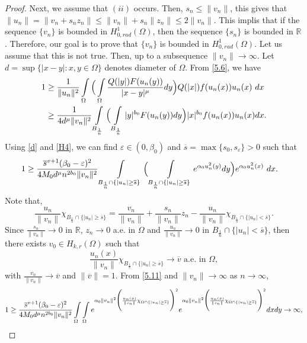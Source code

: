 \documentclass[10pt,a4paper]{amsart}
\newcommand{\R}{\mathbb{R}}
\newcommand{\hr}{H^1_{0, rad}(\Omega)}
\begin{document}
\begin{proof}
		Next, we assume that $(ii)$ occurs. Then, $s_n\leq \|v_n\|$, this gives that $\|u_n\|= \|v_n+ s_n z_n\| \leq \|v_n\|+ s_n \|z_n\|\leq 2 \|v_n\|$. This implis that if the sequence $\{v_n\}$ is bounded in $\hr$, then the sequence $\{s_n\}$ is bounded in $\R$. Therefore, our goal is to prove that $\{v_n\}$ is bounded in $\hr$. Let us assume that this is not true. Then, up to a subsequence $\|v_n\| \rightarrow \infty$. Let  $d= \sup\{ |x-y|: x,y \in \Omega\}$ denotes diameter of $\Omega$. From \eqref{5.6}, we have
		\begin{align}
			1 &\geq \frac{1}{\|u_n\|^2}\int\limits\limits_\Omega \Big( \int\limits\limits_\Omega \frac{Q(|y|)F(u_n(y))}{|x-y|^\mu}dy\Big) Q(|x|)f(u_n(x))u_n(x)\ dx \nonumber\\
			& \geq \frac{1}{4d^\mu \|v_n\|^2} \int\limits\limits_{ B_{\frac{1}{n}}} \Big( \int\limits\limits_{ B_{\frac{1}{n}}} |y|^{b_0}F(u_n(y))dy\Big) |x|^{b_0}f(u_n(x))u_n(x)dx. \nonumber 
		\end{align}
		Using \eqref{d} and \eqref{H4}, we can find $\varepsilon \in (0, \beta_0)$ and $\overline{s} = \max\{s_0, s_\varepsilon\}>0$ such that
		\begin{align}
			1 & \geq \frac{\overline{s}^{v+1}(\beta_0 - \varepsilon)^2}{4M_0d^\mu n^{2b_0} \|v_n\|^2} \int\limits\limits_{ B_{\frac{1}{n}} \cap \{|u_n| \geq \overline{s}\}} \Big( \int\limits\limits_{ B_{\frac{1}{n}} \cap \{|u_n| \geq \overline{s}\}} e^{\alpha_0 u_n^2(y)}dy\Big) e^{\alpha_0 u_n^2(x)}\ dx. \label{5.11}
		\end{align}
		Note that,
		\[ \frac{u_n}{\|v_n\|} \chi_{ B_{\frac{1}{n}} \cap \{|u_n| \geq \overline{s}\}} = \frac{v_n}{\|v_n\|} + \frac{s_n}{\|v_n\|}z_n - \frac{u_n}{\|v_n\|} \chi_{ B_{\frac{1}{n}} \cap \{|u_n| < \overline{s}\}}.\]
		Since $\frac{s_n}{\|v_n\|} \rightarrow 0$ in $\R$, $z_n \rightarrow 0$ a.e. in $\Omega$ and $\frac{u_n}{\|v_n\|} \rightarrow 0$ in $ B_{\frac{1}{n}} \cap \{|u_n| < \overline{s}\}$, then there exists $v_0 \in H_{k,r}(\Omega)$ such that 
		\begin{equation*}
			\frac{u_n(x)}{\|v_n\|} \chi_{ B_{\frac{1}{n}} \cap \{ |u_n| \geq \overline{s}\}} \rightarrow \overline{v} \text{ a.e. in } \Omega,
		\end{equation*}
		with $\frac{v_n}{\|v_n\|} \rightarrow \overline{v}$ and $\|\overline{v}\|=1$. From \eqref{5.11} and $\|v_n\| \to \infty$ as $n\to \infty$, 
		\begin{equation*}
			1\geq \frac{\overline{s}^{v+1}(\beta_0 - \varepsilon)^2}{4M_0d^\mu n^{2b_0}\|v_n\|^2} \int\limits\limits_\Omega \int\limits\limits_\Omega e^{\alpha_0 \|v_n\|^2 \Bigg( \frac{u_n(x)}{\|v_n\|} \chi_{\Omega \cap \{ |u_n| \geq \overline{s}\}}\Bigg)^2} e^{\alpha_0 \|v_n\|^2 \Bigg( \frac{u_n(x)}{\|v_n\|} \chi_{\Omega \cap \{ |u_n| \geq \overline{s}\}}\Bigg)^2}dx dy\rightarrow \infty, 

\end{equation*}
\end{proof}
\end{document}
